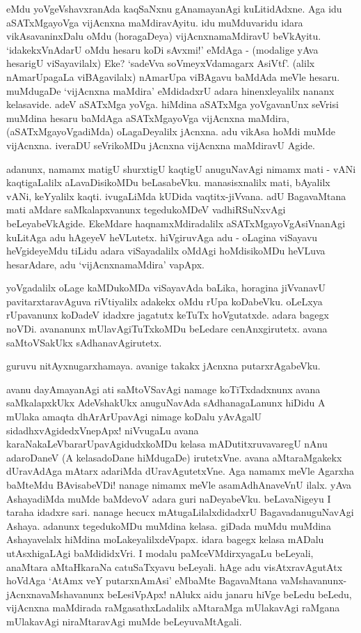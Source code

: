 eMdu yoVgeVshavxranAda kaqSaNxnu gAnamayanAgi kuLitidAdxne. Aga idu aSATxMgayoVga vijAcnxna maMdiravAyitu. idu muMduvaridu idara vikAsavaninxDalu oMdu (horagaDeya) vijAcnxnamaMdiravU beVkAyitu. `idakekxVnAdarU oMdu hesaru koDi sAvxmi!' eMdAga - (modalige yAva hesarigU viSayavilalx) Eke? `sadeVva soVmeyxVdamagarx AsiVtf'. (alilx nAmarUpagaLa viBAgavilalx) nAmarUpa viBAgavu baMdAda meVle hesaru. muMdugaDe `vijAcnxna maMdira' eMdidadxrU adara hinenxleyalilx nananx kelasavide. adeV aSATxMga yoVga. hiMdina aSATxMga yoVgavanUnx seVrisi muMdina hesaru baMdAga aSATxMgayoVga vijAcnxna maMdira, (aSATxMgayoVgadiMda) oLagaDeyalilx jAcnxna. adu vikAsa hoMdi muMde vijAcnxna. iveraDU seVrikoMDu jAcnxna vijAcnxna maMdiravU Agide.

adanunx, namamx matigU shurxtigU kaqtigU anuguNavAgi nimamx mati - vANi kaqtigaLalilx aLavaDisikoMDu beLasabeVku. manasisxnalilx mati, bAyalilx vANi, keYyalilx kaqti. ivugaLiMda kUDida vaqtitx-jiVvana. adU BagavaMtana mati aMdare saMkalapxvanunx tegedukoMDeV vadhiRSuNxvAgi beLeyabeVkAgide. EkeMdare haqnamxMdiradalilx aSATxMgayoVgAsiVnanAgi kuLitAga adu hAgeyeV heVLutetx. hiVgiruvAga adu - oLagina viSayavu heVgideyeMdu tiLidu adara viSayadalilx oMdAgi hoMdisikoMDu heVLuva hesarAdare, adu `vijAcnxnamaMdira' vapApx.

yoVgadalilx oLage kaMDukoMDa viSayavAda baLika, horagina jiVvanavU pavitarxtaravAguva riVtiyalilx adakekx oMdu rUpa koDabeVku. oLeLxya rUpavanunx koDadeV idadxre jagatutx keTuTx hoVgutatxde. adara bagegx noVDi. avananunx mUlavAgiTuTxkoMDu beLedare cenAnxgirutetx. avana saMtoVSakUkx sAdhanavAgirutetx.

guruvu nitAyxnugarxhamaya. avanige takakx jAcnxna putarxrAgabeVku.

avanu dayAmayanAgi ati saMtoVSavAgi namage koTiTxdadxnunx avana saMkalapxkUkx AdeVshakUkx anuguNavAda sAdhanagaLanunx hiDidu A mUlaka amaqta dhArArUpavAgi nimage koDalu yAvAgalU sidadhxvAgidedxVnepApx! niVvugaLu avana karaNakaLeVbararUpavAgidudxkoMDu kelasa mADutitxruvavaregU nAnu adaroDaneV (A kelasadoDane hiMdugaDe) irutetxVne. avana aMtaraMgakekx dUravAdAga mAtarx adariMda dUravAgutetxVne. Aga namamx meVle Agarxha baMteMdu BAvisabeVDi! nanage nimamx meVle asamAdhAnaveVnU ilalx. yAva AshayadiMda muMde baMdevoV adara guri naDeyabeVku. beLavaNigeyu I taraha idadxre sari. nanage hecucx mAtugaLilalxdidadxrU BagavadanuguNavAgi Ashaya. adanunx tegedukoMDu muMdina kelasa. giDada muMdu muMdina Ashayavelalx hiMdina moLakeyalilxdeVpapx. idara bagegx kelasa mADalu utAsxhigaLAgi baMdididxVri. I modalu paMceVMdirxyagaLu beLeyali, anaMtara aMtaHkaraNa catuSaTxyavu beLeyali. hAge adu visAtxravAgutAtx hoVdAga `AtAmx veY putarxnAmAsi' eMbaMte BagavaMtana vaMshavanunx-jAcnxnavaMshavanunx beLesiVpApx! nAlukx aidu janaru hiVge beLedu beLedu, vijAcnxna maMdirada raMgasathxLadalilx aMtaraMga mUlakavAgi raMgana mUlakavAgi niraMtaravAgi muMde beLeyuvaMtAgali.

